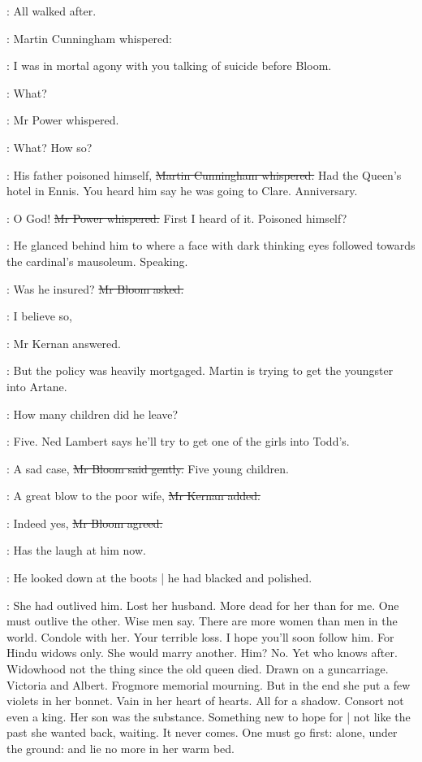 :
All walked after.

:
Martin Cunningham whispered:

\cunningham:
I was in mortal agony with you talking of suicide before Bloom.

\power:
What?

:
Mr Power whispered.

\power:
What?
How so?

\cunningham:
His father poisoned himself,
\sout{Martin Cunningham whispered.}
Had the Queen's hotel in Ennis.
You heard him say he was going to Clare.
Anniversary.

\power:
O God!
\sout{Mr Power whispered.}
First I heard of it.
Poisoned himself?

:
He glanced behind him to where
a face with dark thinking eyes followed towards the cardinal's mausoleum.
Speaking.

\Bloom:
Was he insured?
\sout{Mr Bloom asked.}

:
I believe so,

:
Mr Kernan answered.

:
But the policy was heavily mortgaged.
Martin is trying to get the youngster into Artane.

\Bloom:
How many children did he leave?

:
Five.
Ned Lambert says he'll try to get one of the girls into Todd's.

\Bloom:
A sad case,
\sout{Mr Bloom said gently.}
Five young children.

:
A great blow to the poor wife,
\sout{Mr Kernan added.}

\Bloom:
Indeed yes,
\sout{Mr Bloom agreed.}

\BloomInt:
Has the laugh at him now.

:
He looked down at the boots |
he had blacked and polished.

\BloomInt:
She had outlived him.
Lost her husband.
More dead for her than for me.
One must outlive the other.
Wise men say.
There are more women than men in the world.
Condole with her.
Your terrible loss.
I hope you'll soon follow him.
For Hindu widows only.
She would marry another.
Him?
No.
Yet who knows after.
Widowhood not the thing since the old queen died.
Drawn on a guncarriage.
Victoria and Albert.
Frogmore memorial mourning.
But in the end she put a few violets in her bonnet.
Vain in her heart of hearts.
All for a shadow.
Consort not even a king.
Her son was the substance.
Something new to hope for |
not like the past she wanted back, waiting.
It never comes.
One must go first:
alone, under the ground:
and lie no more in her warm bed.

